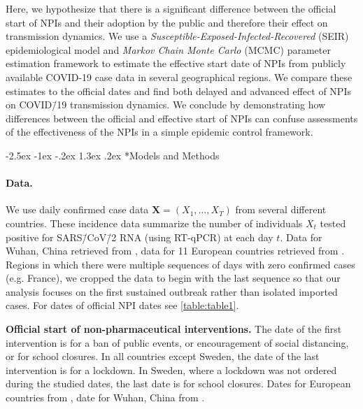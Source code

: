 \documentclass[12pt]{extarticle}
\makeatletter
\renewcommand\section{\@startsection {section}{1}{\z@}%
     {-2.5ex \@plus -1ex \@minus -.2ex}%
     {1.3ex \@plus.2ex}%
    {\Large\bfseries}}
\let\vec\mathbf
\makeatother
\begin{document}
Here, we hypothesize that there is a significant difference between the official start of NPIs and their adoption by the public and therefore their effect on transmission dynamics.
We use a \textit{Susceptible-Exposed-Infected-Recovered} (SEIR) epidemiological model and \textit{Markov Chain Monte Carlo} (MCMC) parameter estimation framework to estimate the effective start date of NPIs from publicly available COVID-19 case data in several geographical regions.
We compare these estimates to the official dates and find both delayed and advanced effect of NPIs on COVID\=/19 transmission dynamics.
We conclude by demonstrating how differences between the official and effective start of NPIs can confuse assessments of the effectiveness of the NPIs in a simple epidemic control framework. %



\section*{Models and Methods}



\paragraph*{Data.} 
We use daily confirmed case data $\vec{X}=(X_1, \ldots, X_T)$ from several different countries. These incidence data summarize the number of individuals $X_t$ tested positive for SARS\=/CoV\=/2 RNA (using RT-qPCR) at each day $t$.
Data for Wuhan, China retrieved from \citet{Pei2020}, data for 11 European countries retrieved from \citet{Flaxman2020}. 
Regions in which there were multiple sequences of days with zero confirmed cases (e.g. France), we cropped the data to begin with the last sequence so that our analysis focuses on the first sustained outbreak rather than isolated imported cases. 
For dates of official NPI dates see \autoref{table:table1}.


 
\begin{table}[h]
\centering
{}
\caption{
\textbf{Official start of non-pharmaceutical interventions.}
The date of the first intervention is for a ban of public events, or encouragement of social distancing, or for school closures.
In all countries except Sweden, the date of the last intervention is for a lockdown. In Sweden, where a lockdown was not ordered during the studied dates, the last date is for school closures. Dates for European countries from \citet{Flaxman2020}, date for Wuhan, China from \citet{Pei2020}.
}
\label{table:table1}
\end{table}
\end{document}
